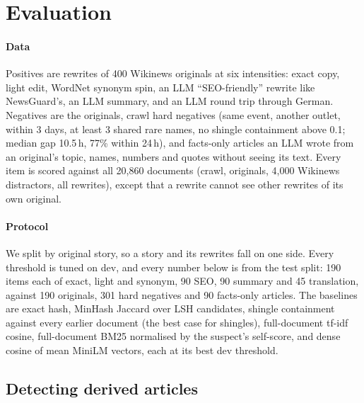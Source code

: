 \documentclass[11pt,a4paper]{article}
\begin{document}
\section{Evaluation}
\label{sec:eval}

\paragraph{Data} Positives are rewrites of 400 Wikinews originals at six intensities: exact copy, light edit, WordNet synonym spin, an LLM ``SEO-friendly'' rewrite like NewsGuard's, an LLM summary, and an LLM round trip through German. Negatives are the originals, crawl hard negatives (same event, another outlet, within 3 days, at least 3 shared rare names, no shingle containment above 0.1; median gap 10.5\,h, 77\% within 24\,h), and facts-only articles an LLM wrote from an original's topic, names, numbers and quotes without seeing its text. Every item is scored against all 20,860 documents (crawl, originals, 4,000 Wikinews distractors, all rewrites), except that a rewrite cannot see other rewrites of its own original.

\paragraph{Protocol} We split by original story, so a story and its rewrites fall on one side. Every threshold is tuned on dev, and every number below is from the test split: 190 items each of exact, light and synonym, 90 SEO, 90 summary and 45 translation, against 190 originals, 301 hard negatives and 90 facts-only articles. The baselines are exact hash, MinHash Jaccard over LSH candidates, shingle containment against every earlier document (the best case for shingles), full-document tf-idf cosine, full-document BM25 normalised by the suspect's self-score, and dense cosine of mean MiniLM vectors, each at its best dev threshold.

\subsection{Detecting derived articles}
\end{document}
